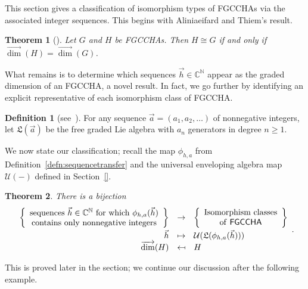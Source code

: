 \documentclass[11pt]{amsart}
\newtheorem{thm}{Theorem}
\theoremstyle{definition}
\newtheorem{definition}[theorem]{Definition}
\numberwithin{equation}{section}
\def\NN{{\mathbb N}}
\def\CC{{\mathbb C}}
\newcommand{\FGCCHA}{\textsf{FGCCHA}\xspace}
\newcommand{\FGCCHAs}{\textsf{FGCCHA}s\xspace}
\newcommand{\vecdim}{\overrightarrow{\dim}}
\begin{document}
This section gives a classification of isomorphism types of \FGCCHAs via the associated integer sequences.  
This begins with Aliniaeifard and Thiem's result.  

\begin{thm}[{\cite[Theorem 4.2]{AT22}}]
\label{thm:AT}
Let $G$ and $H$ be \FGCCHAs.  Then $H \cong G$ if and only if $\vecdim(H) = \vecdim(G)$.
\end{thm}

What remains is to determine which sequences $\vec{h} \in \CC^{\NN}$ appear as the graded dimension of an \FGCCHA, a novel result.  In fact, we go further by identifying an explicit representative of each isomorphism class of \FGCCHA.  

\begin{definition}[{see~\cite[??]{Reutenauer-FreeLieAlgebras}}]
For any sequence $\vec{a} = (a_{1}, a_{2}, \ldots)$ of nonnegative integers, let $\mathfrak{L}(\vec{a})$ be the free graded Lie algebra with $a_{n}$ generators in degree $n \ge 1$.
\end{definition}

We now state our classification; recall the map $\phi_{h, a}$ from Definition~\ref{defn:sequencetransfer} and the universal enveloping algebra map $\mathcal{U}(-)$ defined in Section~\ref{}.

\begin{thm}
\label{prop:h sequence}
\label{thm:h sequence}
There is a bijection
\[
\begin{array}{rcl}
\left\{ \begin{array}{c} \text{sequences $\vec{h} \in \CC^{\NN}$ for which $\phi_{h,a}(\vec{h})$} \\ \text{contains only nonnegative integers} \end{array} \right\} & \to & \left\{ \begin{array}{c} \text{Isomorphism classes} \\ \text{of \FGCCHA} \end{array} \right\} \\[2ex]
\vec{h} & \mapsto & \mathcal{U}(\mathfrak{L}(\phi_{h,a}(\vec{h}))) \\
\vecdim(H) & \mapsfrom & H
\end{array}.
\]
\end{thm}

This is proved later in the section; we continue our discussion after the following example.
\end{document}
